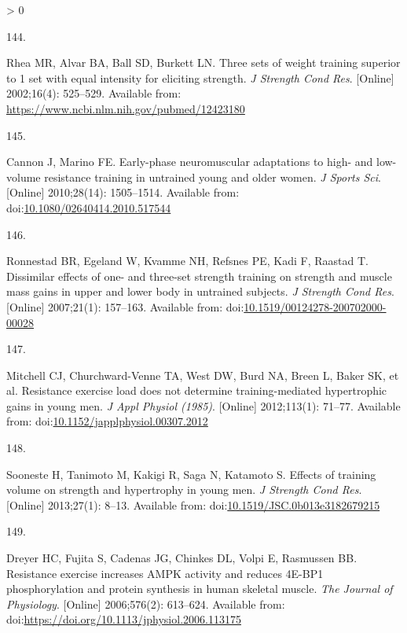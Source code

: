 \documentclass[twoside,10pt]{gihclass} %
\newlength{\cslhangindent}
\newlength{\csllabelwidth}
\newenvironment{CSLReferences}[3] %
 {%
  \setlength{\parindent}{0pt}
  \ifodd #1 \everypar{\setlength{\hangindent}{\cslhangindent}}\ignorespaces\fi
  \ifnum #2 > 0
  \setlength{\parskip}{#2\baselineskip}
  \fi
 }%
 {}
\newcommand{\CSLLeftMargin}[1]{\parbox[t]{\maxof{\widthof{#1}}{\csllabelwidth}}{#1}}
\newcommand{\CSLRightInline}[1]{\parbox[t]{\linewidth}{#1}}
\begin{document}
\begin{CSLReferences}{0}{0}
\leavevmode\hypertarget{ref-RN1384}{}%
\CSLLeftMargin{144. }
\CSLRightInline{Rhea MR, Alvar BA, Ball SD, Burkett LN. Three sets of weight training superior to 1 set with equal intensity for eliciting strength. \emph{J Strength Cond Res}. {[}Online{]} 2002;16(4): 525--529. Available from: \url{https://www.ncbi.nlm.nih.gov/pubmed/12423180}}

\leavevmode\hypertarget{ref-RN1382}{}%
\CSLLeftMargin{145. }
\CSLRightInline{Cannon J, Marino FE. Early-phase neuromuscular adaptations to high- and low-volume resistance training in untrained young and older women. \emph{J Sports Sci}. {[}Online{]} 2010;28(14): 1505--1514. Available from: doi:\href{https://doi.org/10.1080/02640414.2010.517544}{10.1080/02640414.2010.517544}}

\leavevmode\hypertarget{ref-RN776}{}%
\CSLLeftMargin{146. }
\CSLRightInline{Ronnestad BR, Egeland W, Kvamme NH, Refsnes PE, Kadi F, Raastad T. Dissimilar effects of one- and three-set strength training on strength and muscle mass gains in upper and lower body in untrained subjects. \emph{J Strength Cond Res}. {[}Online{]} 2007;21(1): 157--163. Available from: doi:\href{https://doi.org/10.1519/00124278-200702000-00028}{10.1519/00124278-200702000-00028}}

\leavevmode\hypertarget{ref-RN834}{}%
\CSLLeftMargin{147. }
\CSLRightInline{Mitchell CJ, Churchward-Venne TA, West DW, Burd NA, Breen L, Baker SK, et al. Resistance exercise load does not determine training-mediated hypertrophic gains in young men. \emph{J Appl Physiol (1985)}. {[}Online{]} 2012;113(1): 71--77. Available from: doi:\href{https://doi.org/10.1152/japplphysiol.00307.2012}{10.1152/japplphysiol.00307.2012}}

\leavevmode\hypertarget{ref-RN1607}{}%
\CSLLeftMargin{148. }
\CSLRightInline{Sooneste H, Tanimoto M, Kakigi R, Saga N, Katamoto S. Effects of training volume on strength and hypertrophy in young men. \emph{J Strength Cond Res}. {[}Online{]} 2013;27(1): 8--13. Available from: doi:\href{https://doi.org/10.1519/JSC.0b013e3182679215}{10.1519/JSC.0b013e3182679215}}

\leavevmode\hypertarget{ref-RN2710}{}%
\CSLLeftMargin{149. }
\CSLRightInline{Dreyer HC, Fujita S, Cadenas JG, Chinkes DL, Volpi E, Rasmussen BB. Resistance exercise increases AMPK activity and reduces 4E-BP1 phosphorylation and protein synthesis in human skeletal muscle. \emph{The Journal of Physiology}. {[}Online{]} 2006;576(2): 613--624. Available from: doi:\url{https://doi.org/10.1113/jphysiol.2006.113175}}


\end{CSLReferences}
\end{document}
